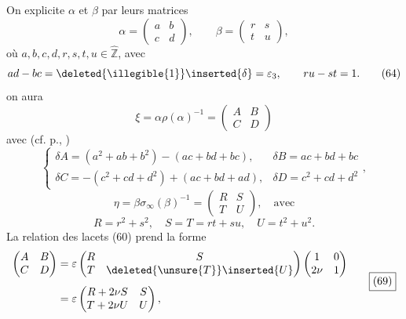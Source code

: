 On explicite $\alpha$ et $\beta$ par leurs matrices
\[
\alpha=\begin{pmatrix}a&b\\c&d\end{pmatrix},\qquad
\beta=\begin{pmatrix}r&s\\t&u\end{pmatrix},
\tag{63}
\]
où $a,b,c,d,r,s,t,u\in\widehat{\mathbb Z}$, avec
\[
ad-bc=\deleted{\illegible{1}}\inserted{\delta}=\varepsilon_3,\qquad ru-st=1.
\tag{64}
\]
on aura
\[
\xi=\alpha\rho(\alpha)^{-1}=\begin{pmatrix}A&B\\C&D\end{pmatrix}
\tag{65}
\]
avec (cf. p., )
\[
\left\{\begin{array}{ll}
\delta A=(a^2+ab+b^2)-(ac+bd+bc),&\delta B=ac+bd+bc\\[4pt]
\delta C=-(c^2+cd+d^2)+(ac+bd+ad),&\delta D=c^2+cd+d^2
\end{array}\right.,
\tag{66}
\]
\[
\eta=\beta\sigma_\infty(\beta)^{-1}=\begin{pmatrix}R&S\\T&U\end{pmatrix},\quad\text{avec}
\tag{67}
\]
\[
R=r^2+s^2,\quad S=T=rt+su,\quad U=t^2+u^2.
\tag{68}
\]
La relation des lacets (60) prend la forme
\[
\begin{aligned}
\begin{pmatrix}A&B\\C&D\end{pmatrix}
&=\varepsilon\begin{pmatrix}R&S\\T&\deleted{\unsure{T}}\inserted{U}\end{pmatrix}
\begin{pmatrix}1&0\\2\nu&1\end{pmatrix}\\[4pt]
&=\varepsilon\begin{pmatrix}R+2\nu S&S\\T+2\nu U&U\end{pmatrix},
\end{aligned}
\tag*{\boxed{(69)}}
\]


